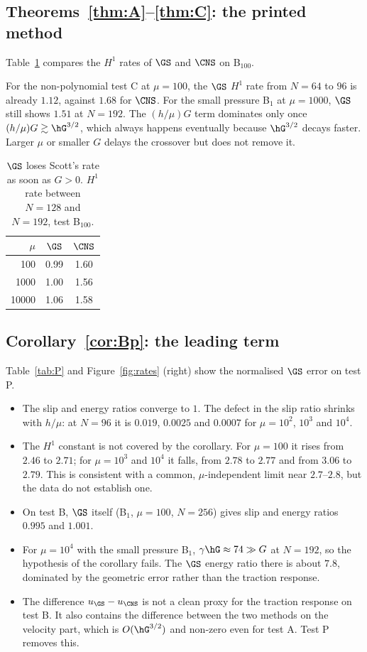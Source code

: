 \subsection*{Theorems~\ref{thm:A}--\ref{thm:C}: the printed method}
Table~\ref{tab:gs} compares the $H^1$ rates of $\GS$ and $\CNS$ on B$_{100}$.

For the non-polynomial test C at $\mu=100$, the $\GS$ $H^1$ rate from $N=64$ to $96$ is already $1.12$, against $1.68$ for $\CNS$. For the small pressure B$_1$ at $\mu=1000$, $\GS$ still shows $1.51$ at $N=192$. The $(h/\mu)G$ term dominates only once $(h/\mu)G\gtrsim\hG^{3/2}$, which always happens eventually because $\hG^{3/2}$ decays faster. Larger $\mu$ or smaller $G$ delays the crossover but does not remove it.

\begin{table}[t]
\centering
\caption{$\GS$ loses Scott's rate as soon as $G>0$. $H^1$ rate between $N=128$ and $N=192$, test B$_{100}$.}\label{tab:gs}
\begin{tabular}{rcc}
\toprule
$\mu$ & $\GS$ & $\CNS$\\
\midrule
100 & 0.99 & 1.60\\
1000 & 1.00 & 1.56\\
10000 & 1.06 & 1.58\\
\bottomrule
\end{tabular}
\end{table}

\subsection*{Corollary~\ref{cor:Bp}: the leading term}
Table~\ref{tab:P} and Figure~\ref{fig:rates} (right) show the normalised $\GS$ error on test P.
\begin{itemize}
\item The slip and energy ratios converge to $1$. The defect in the slip ratio shrinks with $h/\mu$: at $N=96$ it is $0.019$, $0.0025$ and $0.0007$ for $\mu=10^2$, $10^3$ and $10^4$.
\item The $H^1$ constant is not covered by the corollary. For $\mu=100$ it rises from $2.46$ to $2.71$; for $\mu=10^3$ and $10^4$ it falls, from $2.78$ to $2.77$ and from $3.06$ to $2.79$. This is consistent with a common, $\mu$-independent limit near $2.7$--$2.8$, but the data do not establish one.
\item On test B, $\GS$ itself (B$_1$, $\mu=100$, $N=256$) gives slip and energy ratios $0.995$ and $1.001$.
\item For $\mu=10^4$ with the small pressure B$_1$, $\gamma\hG\approx74\gg G$ at $N=192$, so the hypothesis of the corollary fails. The $\GS$ energy ratio there is about $7.8$, dominated by the geometric error rather than the traction response.
\item The difference $u_{\GS}-u_{\CNS}$ is not a clean proxy for the traction response on test B. It also contains the difference between the two methods on the velocity part, which is $O(\hG^{3/2})$ and non-zero even for test A. Test P removes this.
\end{itemize}

